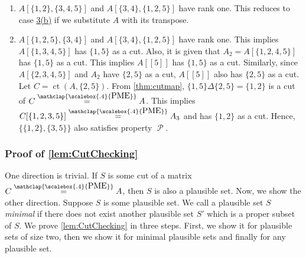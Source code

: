 \documentclass[11pt,letterpaper]{article}
\DeclareMathOperator{\calP}{\mathcal{P}}
\newcommand{\pp}[2]{\{\{#1\},\{#2\}\}}
\DeclareMathOperator*{\ct}{ct}
\newcommand{\PME}{\stackrel{\mathclap{\scalebox{.4}{\mbox{PME}}}}{=}}
\begin{document}
{{{\begin{enumerate}
\begin{enumerate}
        \[A[[5]]= \begin{bmatrix}
            * & 1 & 1& 1 & 1\\
            a/\alpha & * & a & a & a\\
            b & \alpha b & * & * & *\\
            c & \alpha c & * & * & \alpha c\\
            d & \alpha d & \alpha d & \alpha d & *
        \end{bmatrix}\]
        Since $A[\{3,4,5\},\{1,2\}]$ has rank one, there exists a non-zero  scalar $\alpha$ such that $A[(3,4,5),2]=\alpha(b,c,d)^T$. Since $A_2$ satisfies \cref{eq:PropPtransitive-2}, $A[\{1,5\},\{2,4\}]$ and $A[\{1,4\},\{2,5\}]$ both have rank one. Hence, $A[5,4]=\alpha d$ and $A[4,5]=\alpha c$.  Since $A[\{1,2,5\},\{3,4\}]$ has rank one, $A[2,4]=a, A[5,3]=\alpha d$. Since $A_2$ satisfies \cref{eq:PropPtransitive-2}, $A[\{2,5\},\{1,4\}]$ has rank one. This implies $A[2,1]=\frac{A[5,1]A[2,4]}{A[5,4]}= a/\alpha$. Finally, since $A[\{2,4\},\{1,5\}]$ has rank one, $A[2,5]=\frac{A[2,1]A[4,5]}{A[4,1]}=\frac{a/\alpha\cdot \alpha c}{c}=a.$ This completes the argument why $A[[5]]$ appears as above.
        \item $A[\{1,2\},\{3,4,5\}]$ and $A[\{3,4\},\{1,2,5\}]$ have rank one. This reduces to case \hyperref[item:cut-detec-lem1-case3b]{3(b)} if we substitute $A$ with its transpose.
        \item $A[\{1,2,5\},\{3,4\}]$ and $A[\{3,4\},\{1,2,5\}]$ have rank one. This implies $A[\{1,3,4,5\}]$ has $\{1,5\}$ as a cut. Also, it is given that $A_2=A[\{1,2,4,5\}]$ has $\{1,5\}$ as a cut. This implies $A[[5]]$ has $\{1,5\}$ as a cut. Similarly, since $A[\{2,3,4,5\}]$ and $A_2$ have $\{2,5\}$ as a cut, $A[[5]]$ also has $\{2,5\}$ as a cut. Let $C=\ct(A,\{2,5\})$. From \cref{thm:cutmap}, $\{1,5\}\Delta \{2,5\}=\{1,2\}$ is a cut of $C\PME A$. This implies $C[\{1,2,3,5\}]\PME A_3$ and has $\{1,2\}$ as a cut. Hence, $\pp{1,2}{3,5}$ also satisfies property $\calP$. 
    \end{enumerate}
\end{enumerate}

\subsubsection{Proof of \cref{lem:CutChecking}}\label{subsec:PlausibleIsCut}
One direction is trivial. If $S$ is some cut of a matrix $C\PME A$, then $S$ is also a plausible set. Now, we show the other direction. Suppose $S$ is some plausible set. We call a plausible set $S$ \emph{minimal} if there does not exist another plausible set $S'$ which is a proper subset of $S$. We prove \cref{lem:CutChecking} in three steps. First, we show it for plausible sets of size two, then we show it for minimal plausible sets and finally for any plausible set.

}}}
\end{document}
